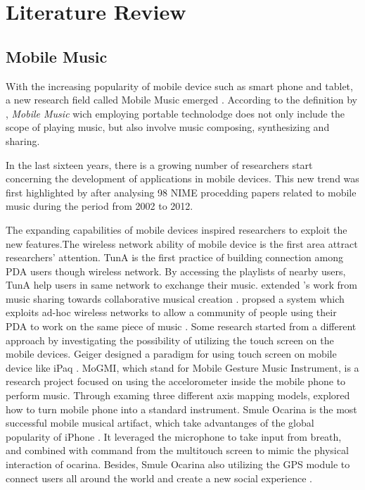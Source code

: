 \pagestyle{fancy}
\rhead{\thepage}
\chapter{Literature Review}
\label{ch: chapter 2}

\section{Mobile Music}

With the increasing popularity of mobile device such as smart phone and tablet, a new research field called Mobile Music emerged \citep{Reference4}. According to the definition by \citeauthor{Reference6}, \textit{Mobile Music} wich employing portable technolodge does not only include the scope of playing music, but also involve music composing, synthesizing and sharing\citep{Reference6}.

In the last sixteen years, there is a growing number of researchers start concerning the development of applications in mobile devices. This new trend was first highlighted by \citeauthor{Reference12} after analysing 98 NIME procedding papers related to mobile music during the period from 2002 to 2012\citep{Reference12}.

The expanding capabilities of mobile devices inspired researchers to exploit the new features.The wireless network ability of mobile device is the first area attract researchers' attention. TunA is the first practice of building connection among PDA users though wireless network\citep{Reference7}. By accessing the playlists of nearby users, TunA help users in same network to exchange their music. \citeauthor{Reference5} extended \citeauthor{Reference7}'s work from music sharing towards collaborative musical creation \citep{Reference5}. \citeauthor{Reference5} propsed a system which exploits ad-hoc wireless networks to allow a community of people using their PDA to work on the same piece of music \citep{Reference5}. Some research started from a different approach by investigating the possibility of utilizing the touch screen on the mobile devices. Geiger designed a paradigm for using touch screen on mobile device like iPaq \citep{Reference9, Reference10}.
MoGMI, which stand for Mobile Gesture Music Instrument, is a research project focused on using the accelorometer inside the mobile phone to perform music. Through examing three different axis mapping models, \citeauthor{Reference11} explored how to turn mobile phone into a standard instrument. Smule Ocarina is the most successful mobile musical artifact, which take advantanges of the global popularity of iPhone \citep{Reference8.1}. It leveraged the microphone to take input from breath, and combined with command from the multitouch screen to mimic the physical interaction of ocarina. Besides, Smule Ocarina also utilizing the GPS module to connect users all around the world and create a new social experience \citep{Reference8}.


